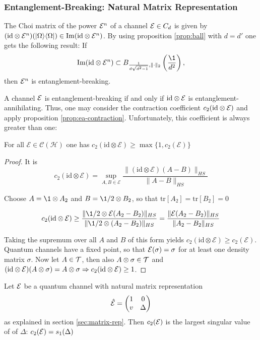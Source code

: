 \subsubsection{Entanglement-Breaking: Natural Matrix Representation}

The Choi matrix of the power $\mathcal E^n$ of a channel $\mathcal E \in C_d$ is given by $(\mathrm{id} \otimes \mathcal E^n)(\lvert\Omega\rangle\langle\Omega\rvert) \in \mathrm{Im}
(\mathrm{id} \otimes \mathcal E^n)$. By using proposition \ref{prop:ball} with $d=d'$ one gets the following result: If 
\begin{align}
    \Im(\id \otimes \m E^n) \subset B_{\frac{1}{d\sqrt{d^2-1}},\norm \cdot_2}\left(\frac{\1}{d^2}\right),
\end{align}
then $\mathcal E^n$ is entanglement-breaking.

A channel $\mathcal E$ is entanglement-breaking if and only if $\mathrm{id} \otimes \mathcal E$ is entanglement-annihilating. Thus, one may consider the contraction coefficient $c_2(\mathrm{id} \otimes \mathcal E)$ and apply proposition \ref{prop:ea-contraction}. Unfortunately, this coefficient is always greater than one:
\begin{prop}
For all $ \mathcal{E} \in \mathcal{C}(\mathcal{H})$ one has $ c_2(\text{id} \otimes \mathcal{E}) \ge \max \{1, c_2(\mathcal{E})\}$
\end{prop}
\begin{proof}
It is
$$ c_2(\text{id} \otimes \mathcal{E}) = \sup_{A, B \in \mathcal{{E}}} \frac{\|(\text{id} \otimes \mathcal{E})(A - B)\|_{HS}}{\|A - B\|_{HS}} $$

Choose $A = \1 \otimes A_2$ and $B = \1 / 2 \otimes B_2$, so that $\text{tr}[A_2] = \text{tr}[B_2] = 0$

$$ c_2(\text{id} \otimes \mathcal{E}) \ge \frac{\|\1 / 2 \otimes \mathcal{E}(A_2 - B_2)\|_{HS}}{\|\1 / 2 \otimes (A_2 - B_2)\|_{HS}} = \frac{\|\mathcal{E}(A_2 - B_2)\|_{HS}}{\|A_2 - B_2\|_{HS}} $$

Taking the supremum over all $A$ and $B$ of this form yields $c_2(\text{id} \otimes \mathcal{E}) \ge c_2(\mathcal{E})$.
Quantum channels have a fixed point, so that $\mathcal E(\sigma) = \sigma$ for at least one density matrix $\sigma$. Now let $A\in \mathcal T$, then also $A \otimes \sigma \in \mathcal T$ and $(\mathrm{id} \otimes \mathcal E)(A \otimes \sigma) = A \otimes \sigma \Rightarrow c_2(\mathrm{id} \otimes \mathcal E) \geq 1$.
\end{proof}
\begin{lemma}
    Let $\mathcal E$ be a quantum channel with natural matrix representation 
    \begin{align*}
    \hat{\mathcal E}= \begin{pmatrix}
         1 & 0\\
        v & \Delta
    \end{pmatrix}
    \end{align*}
    as explained in section \ref{sec:matrix-rep}. Then $c_2(\mathcal E)$ is the largest singular value of of $\Delta$: $c_2(\mathcal E) = s_1(\Delta)$
\end{lemma}
